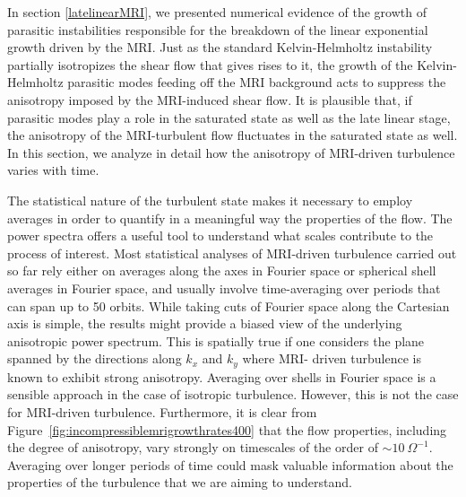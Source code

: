 \documentclass[]{emulateapj}
\begin{document}
In section \ref{latelinearMRI}, we presented numerical evidence of the
growth of parasitic instabilities responsible for the breakdown of the linear
exponential growth driven by the MRI.  Just as the standard
Kelvin-Helmholtz instability partially isotropizes the shear flow that
gives rises to it, the growth of the Kelvin-Helmholtz parasitic modes
feeding off the MRI background acts to suppress the anisotropy imposed
by the MRI-induced shear flow. It is plausible that, if parasitic modes
play a role in the saturated state as well as the late linear stage,
the anisotropy of the MRI-turbulent flow fluctuates in the 
saturated state as well. In this section, we analyze in detail 
how the anisotropy of MRI-driven turbulence varies with time.

The statistical nature of the turbulent state makes it necessary to
employ averages in order to quantify in a meaningful way the
properties of the flow.  The power spectra offers a useful tool to
understand what scales contribute to the process of interest.
Most statistical analyses of MRI-driven turbulence 
carried out so far rely either on averages along the axes in Fourier space
or spherical shell averages in Fourier space, and usually involve
time-averaging over periods that can span up to 50 orbits.
While taking cuts of Fourier space along the Cartesian axis is simple,
the results might provide a biased view of the underlying anisotropic 
power spectrum.  This is spatially true if one considers the plane spanned
by the directions along $k_x$ and $k_y$ where MRI- driven turbulence
is known to exhibit strong anisotropy.  Averaging over shells in Fourier space is a 
sensible approach in the case of isotropic turbulence. However, this is not the case 
for MRI-driven turbulence. Furthermore, it is clear from 
Figure~\ref{fig:incompressiblemrigrowthrates400} that the flow properties, 
including the degree of anisotropy, vary strongly on timescales of the order of 
$\sim10 ~\Omega^{-1}$. Averaging over longer periods of time could mask valuable 
information about the properties of the turbulence that we are aiming to understand. 
\end{document}
